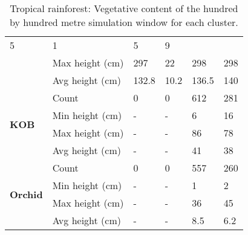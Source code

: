 \begin{table}[]
\begin{tabular}{|p{2cm}|p{2cm}|p{2cm}|p{2cm}|p{2cm}|p{2cm}|}
						\multicolumn{1}{l|}{5} & 
						\multicolumn{1}{l|}{1} &
						\multicolumn{1}{l|}{5} & 
						\multicolumn{1}{l|}{9} \\\cline{2-6} &
						\multicolumn{1}{l|}{Max height (cm)} & 
						\multicolumn{1}{l|}{297} & 
						\multicolumn{1}{l|}{22} &
						\multicolumn{1}{l|}{298} & 
						\multicolumn{1}{l|}{298} \\\cline{2-6} &
						\multicolumn{1}{l|}{Avg height (cm)} & 
						\multicolumn{1}{l|}{132.8} & 
						\multicolumn{1}{l|}{10.2} &
						\multicolumn{1}{l|}{136.5} & 
						\multicolumn{1}{l|}{140} \\\cline{2-6}
		\hline      
		\multirow{4}{*}{\textbf{KOB}} & 
						\multicolumn{1}{l|}{Count} & 
						\multicolumn{1}{l|}{0} & 
						\multicolumn{1}{l|}{0} &
						\multicolumn{1}{l|}{612} & 
						\multicolumn{1}{l|}{281} \\\cline{2-6} &
						\multicolumn{1}{l|}{Min height (cm)} & 
						\multicolumn{1}{l|}{-} & 
						\multicolumn{1}{l|}{-} &
						\multicolumn{1}{l|}{6} & 
						\multicolumn{1}{l|}{16} \\\cline{2-6} &
						\multicolumn{1}{l|}{Max height (cm)} & 
						\multicolumn{1}{l|}{-} & 
						\multicolumn{1}{l|}{-} &
						\multicolumn{1}{l|}{86} & 
						\multicolumn{1}{l|}{78} \\\cline{2-6} &
						\multicolumn{1}{l|}{Avg height (cm)} & 
						\multicolumn{1}{l|}{-} & 
						\multicolumn{1}{l|}{-} &
						\multicolumn{1}{l|}{41} & 
						\multicolumn{1}{l|}{38} \\\cline{2-6}
		\hline     
		\multirow{4}{*}{\textbf{Orchid}} & 
						\multicolumn{1}{l|}{Count} & 
						\multicolumn{1}{l|}{0} & 
						\multicolumn{1}{l|}{0} &
						\multicolumn{1}{l|}{557} & 
						\multicolumn{1}{l|}{260} \\\cline{2-6} &
						\multicolumn{1}{l|}{Min height (cm)} & 
						\multicolumn{1}{l|}{-} & 
						\multicolumn{1}{l|}{-} &
						\multicolumn{1}{l|}{1} & 
						\multicolumn{1}{l|}{2} \\\cline{2-6} &
						\multicolumn{1}{l|}{Max height (cm)} & 
						\multicolumn{1}{l|}{-} & 
						\multicolumn{1}{l|}{-} &
						\multicolumn{1}{l|}{36} & 
						\multicolumn{1}{l|}{45} \\\cline{2-6} &
						\multicolumn{1}{l|}{Avg height (cm)} & 
						\multicolumn{1}{l|}{-} & 
						\multicolumn{1}{l|}{-} &
						\multicolumn{1}{l|}{8.5} & 
						\multicolumn{1}{l|}{6.2} \\\cline{2-6}
		\hline                                                       
		\end{tabular}
	\label{tab:species_cluster_properties}	
	\caption{Tropical rainforest: Vegetative content of the hundred by hundred metre simulation window for each cluster.}
\end{table}

